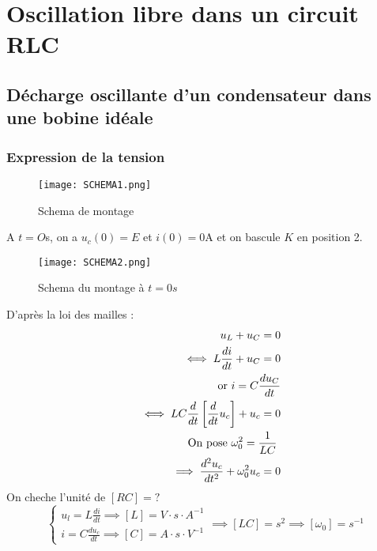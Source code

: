 
\chapter{Oscillation libre dans un circuit RLC}
\section{Décharge oscillante d'un condensateur dans une bobine idéale}
\subsection{Expression de la tension}

\begin{figure}[!htb]
    \centering
    \texttt{[image: SCHEMA1.png]}
    \caption{Schema de montage}
    \label{fig:SCHEMA1}
\end{figure}


A \(t = O\)s, on a \(u_{c}(0) = E\) et \(i(0) = 0\)A et on bascule \(K\) en position 2. 

\begin{figure}[!htb]
    \centering
    \texttt{[image: SCHEMA2.png]}
    \caption{Schema du montage à \(t=0 \unit{s}\)}
    \label{fig:SCHEMA2}
\end{figure}



D'après la loi des mailles :
\begin{eqnarray*}
    &&u_{L} + u_{C} = 0\\
    &&\iff L \frac{di}{dt} + u_{C} = 0\\
    &&\text{or } i = C \frac{du_{C}}{dt} \\
    &&\iff LC \frac{d}{dt}\left[ \frac{d}{dt}u_{c} \right] + u_{c} = 0\\
    &&\textnormal{On pose \(\omega_{0}^{2} = \frac{1}{LC}\) }\\
    &&\implies \frac{d^{2}u_{c}}{dt^{2}} + \omega_{0}^{2} u_{c} = 0
\end{eqnarray*}
On cheche l'unité de \(\left[ RC \right] = ?\)\\
\[
    \begin{cases}
        u_{l} = L \frac{di}{dt} \implies [L] = V \cdot s \cdot A^{-1}\\
        i = C \frac{du_{c}}{dt} \implies \left[ C \right] = A \cdot  s \cdot  V^{-1}
    \end{cases}
    \implies \left[ LC \right] = s^{2} \implies \left[ \omega_{0} \right] = s^{-1}
\] 

